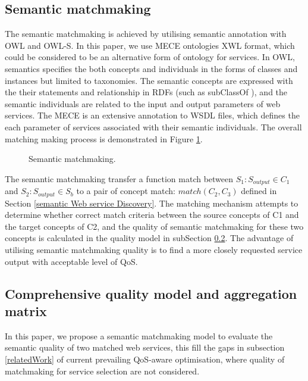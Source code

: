 \documentclass{llncs}
\begin{document}
\subsection{Semantic matchmaking}
The semantic matchmaking is achieved by utilising semantic annotation with OWL and OWL-S. In this paper, we use MECE ontologies \cite{bleul2008self} XWL format, which could be considered to be an alternative form of ontology for services. In OWL, semantics specifies the both concepts and individuals in the forms of classes and instances but limited to taxonomies. The semantic concepts are expressed with the their statements and relationship in RDFs (such as subClassOf ), and the semantic individuals are related to the input and output parameters of web services. The MECE is an extensive annotation to WSDL files, which defines the each parameter of services associated with their semantic individuals. The overall matching making process is demonstrated in Figure \ref{matchmaking}.

\begin{figure}[h]
\centerline{
}
 \caption{Semantic matchmaking.}
 \label{matchmaking}
\end{figure}

The semantic matchmaking transfer a function match between $S_{1}: S_{output} \in C_{1}$ and $S_{2}:S_{output} \in S_{b}$ to a pair of concept match: $match(C_{2}, C_{3})$ defined in Section \ref{semantic Web service Discovery}. The matching mechanism attempts to determine whether correct match criteria between the source concepts of C1 and the target concepts of C2, and the quality of semantic matchmaking for these two concepts is calculated in the quality model in subSection \ref{qualityModel}. The advantage of utilising semantic matchmaking quality is to find a more closely requested service output with acceptable level of QoS.

\subsection{Comprehensive quality model and aggregation matrix}\label{qualityModel}
In this paper, we propose a semantic matchmaking model to evaluate the semantic quality of two matched web services, this fill the gaps in subsection \ref{relatedWork} of current prevailing QoS-aware optimisation, where quality of matchmaking for service selection are not considered.
\end{document}
